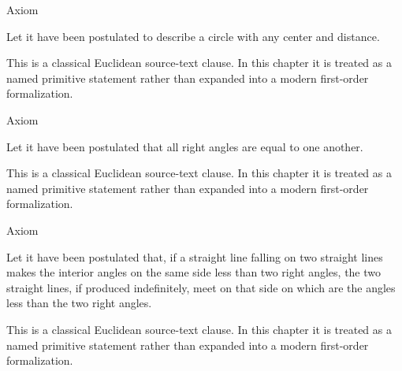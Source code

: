 \begin{lra-not-visible}
\NoLocalDependencies
\end{lra-not-visible}

\begin{axiombox}{Axiom}
\begin{axiom}
\label{ax:euclid-postulate-describe-circle}
Let it have been postulated to describe a circle with any center and distance.
\end{axiom}
\end{axiombox}
\begin{remark*}
This is a classical Euclidean source-text clause. In this chapter it is treated
as a named primitive statement rather than expanded into a modern first-order
formalization.
\end{remark*}

\begin{lra-not-visible}
\NoLocalDependencies
\end{lra-not-visible}

\begin{axiombox}{Axiom}
\begin{axiom}
\label{ax:euclid-postulate-right-angles-equal}
Let it have been postulated that all right angles are equal to one another.
\end{axiom}
\end{axiombox}
\begin{remark*}
This is a classical Euclidean source-text clause. In this chapter it is treated
as a named primitive statement rather than expanded into a modern first-order
formalization.
\end{remark*}

\begin{lra-not-visible}
\NoLocalDependencies
\end{lra-not-visible}

\begin{axiombox}{Axiom}
\begin{axiom}
\label{ax:euclid-postulate-parallel}
Let it have been postulated that, if a straight line falling on two straight
lines makes the interior angles on the same side less than two right angles,
the two straight lines, if produced indefinitely, meet on that side on which are
the angles less than the two right angles.
\end{axiom}
\end{axiombox}
\begin{remark*}
This is a classical Euclidean source-text clause. In this chapter it is treated
as a named primitive statement rather than expanded into a modern first-order
formalization.
\end{remark*}

\begin{lra-not-visible}
\NoLocalDependencies
\end{lra-not-visible}
